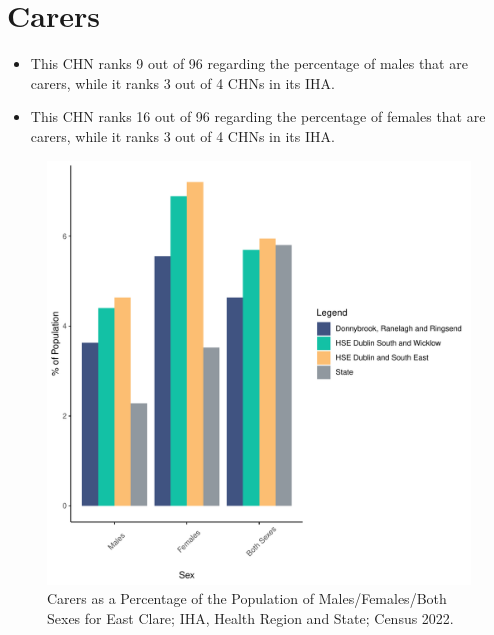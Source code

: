 \documentclass{article}
\begin{document}
\section{Carers}\label{sect:Carers}
\begin{itemize}
\item This CHN ranks  9 out of 96 regarding the percentage of males that are carers, while it ranks   3 out of 4 CHNs in its IHA.
\item This CHN ranks  16 out of 96 regarding the percentage of females that are carers, while it ranks   3 out of 4 CHNs in its IHA.
\end{itemize}
\begin{figure}[H]
	\centering
	\includegraphics[width = 150mm]{../figures/CareED.pdf}
	\caption{Carers as a Percentage of the Population of Males/Females/Both Sexes for East Clare; IHA, Health Region and State; Census 2022.}
	\label{fig:2ae19629-1a6a-13a3-e055-000000000001}
	\end{figure}
\end{document}
